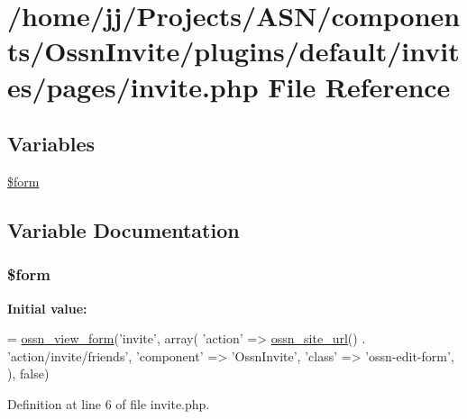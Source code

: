 \hypertarget{plugins_2default_2invites_2pages_2invite_8php}{}\section{/home/jj/\+Projects/\+A\+S\+N/components/\+Ossn\+Invite/plugins/default/invites/pages/invite.php File Reference}
\label{plugins_2default_2invites_2pages_2invite_8php}
\subsection*{Variables}
\begin{DoxyCompactItemize}
\item 
\hyperlink{plugins_2default_2invites_2pages_2invite_8php_a1a4fda4c28a9ee5f91102c023b9501f4}{\$form}
\end{DoxyCompactItemize}


\subsection{Variable Documentation}
\subsubsection[{\texorpdfstring{\$form}{$form}}]{\setlength{\rightskip}{0pt plus 5cm}\$form}\hypertarget{plugins_2default_2invites_2pages_2invite_8php_a1a4fda4c28a9ee5f91102c023b9501f4}{}\label{plugins_2default_2invites_2pages_2invite_8php_a1a4fda4c28a9ee5f91102c023b9501f4}
{\bfseries Initial value\+:}
\begin{DoxyCode}
= \hyperlink{ossn_8lib_8views_8php_ac874e6342b6bbe7ac279180d7b4dcd2b}{ossn\_view\_form}(\textcolor{stringliteral}{'invite'}, array(
        \textcolor{stringliteral}{'action'} => \hyperlink{ossn_8lib_8system_8php_a2f12f9244f99eccd1225afb76ef2ab65}{ossn\_site\_url}() . \textcolor{stringliteral}{'action/invite/friends'},
        \textcolor{stringliteral}{'component'} => \textcolor{stringliteral}{'OssnInvite'},
        \textcolor{stringliteral}{'class'} => \textcolor{stringliteral}{'ossn-edit-form'},        
    ), \textcolor{keyword}{false})
\end{DoxyCode}


Definition at line 6 of file invite.\+php.

